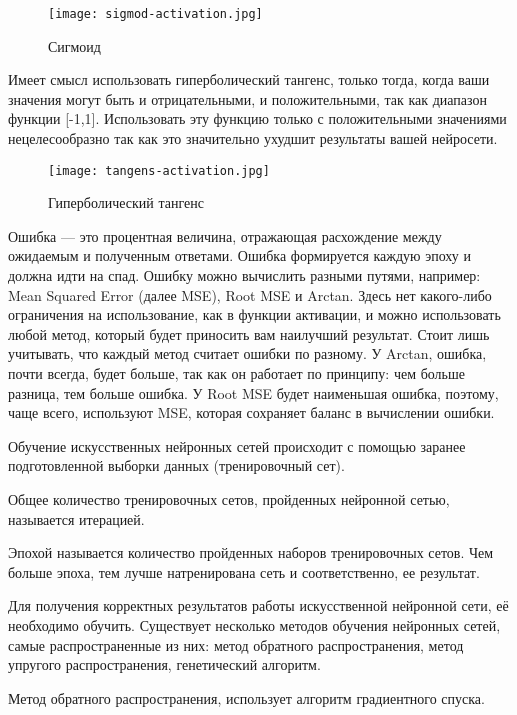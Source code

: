 \begin{figure}[!ht]
  \centering
  \texttt{[image: sigmod-activation.jpg]} 
  \caption{Сигмоид}
  \label{fig:analysis:sigmod-activation}
\end{figure}

Имеет смысл использовать гиперболический тангенс, только тогда, когда ваши значения могут быть и отрицательными, и
положительными, так как диапазон функции [-1,1]. Использовать эту функцию только с положительными значениями
нецелесообразно так как это значительно ухудшит результаты вашей нейросети.

\begin{figure}[!ht]
  \centering
  \texttt{[image: tangens-activation.jpg]} 
  \caption{Гиперболический тангенс}
  \label{fig:analysis:tangens-activation}
\end{figure}

Ошибка — это процентная величина, отражающая расхождение между ожидаемым и полученным ответами. Ошибка формируется
каждую эпоху и должна идти на спад. Ошибку можно вычислить разными путями, например:
Mean Squared Error (далее MSE), Root MSE и Arctan.
Здесь нет какого-либо ограничения на использование, как в функции активации, и можно использовать любой метод, который
будет приносить вам наилучший результат. Стоит лишь учитывать, что каждый метод считает ошибки по разному.
У Arctan, ошибка, почти всегда, будет больше, так как он работает по принципу: чем больше разница, тем больше ошибка.
У Root MSE будет наименьшая ошибка, поэтому, чаще всего, используют MSE, которая сохраняет баланс в вычислении ошибки.

Обучение искусственных нейронных сетей происходит с помощью заранее подготовленной выборки данных (тренировочный сет).

Общее количество тренировочных сетов, пройденных нейронной сетью, называется итерацией.

Эпохой называется количество пройденных наборов тренировочных \linebreak сетов. Чем больше эпоха, тем лучше натренирована сеть и
соответственно, ее результат.

Для получения корректных результатов работы искусственной нейронной сети, её необходимо обучить. Существует несколько
методов обучения нейронных сетей, самые распространенные из них: метод обратного распространения,
метод упругого распространения, генетический алгоритм.

Метод обратного распространения, использует алгоритм градиентного спуска.

